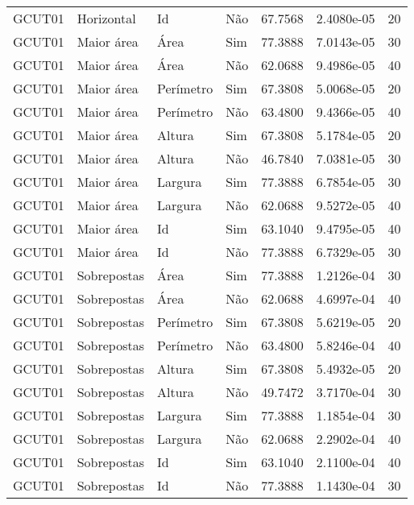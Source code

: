 \begin{tabular}{llllrrr}
GCUT01    & Horizontal  & Id        & Não         & 67.7568      & 2.4080e-05 & 20       \\
GCUT01    & Maior área  & Área      & Sim         & 77.3888      & 7.0143e-05 & 30       \\
GCUT01    & Maior área  & Área      & Não         & 62.0688      & 9.4986e-05 & 40       \\
GCUT01    & Maior área  & Perímetro & Sim         & 67.3808      & 5.0068e-05 & 20       \\
GCUT01    & Maior área  & Perímetro & Não         & 63.4800      & 9.4366e-05 & 40       \\
GCUT01    & Maior área  & Altura    & Sim         & 67.3808      & 5.1784e-05 & 20       \\
GCUT01    & Maior área  & Altura    & Não         & 46.7840      & 7.0381e-05 & 30       \\
GCUT01    & Maior área  & Largura   & Sim         & 77.3888      & 6.7854e-05 & 30       \\
GCUT01    & Maior área  & Largura   & Não         & 62.0688      & 9.5272e-05 & 40       \\
GCUT01    & Maior área  & Id        & Sim         & 63.1040      & 9.4795e-05 & 40       \\
GCUT01    & Maior área  & Id        & Não         & 77.3888      & 6.7329e-05 & 30       \\
GCUT01    & Sobrepostas & Área      & Sim         & 77.3888      & 1.2126e-04 & 30       \\
GCUT01    & Sobrepostas & Área      & Não         & 62.0688      & 4.6997e-04 & 40       \\
GCUT01    & Sobrepostas & Perímetro & Sim         & 67.3808      & 5.6219e-05 & 20       \\
GCUT01    & Sobrepostas & Perímetro & Não         & 63.4800      & 5.8246e-04 & 40       \\
GCUT01    & Sobrepostas & Altura    & Sim         & 67.3808      & 5.4932e-05 & 20       \\
GCUT01    & Sobrepostas & Altura    & Não         & 49.7472      & 3.7170e-04 & 30       \\
GCUT01    & Sobrepostas & Largura   & Sim         & 77.3888      & 1.1854e-04 & 30       \\
GCUT01    & Sobrepostas & Largura   & Não         & 62.0688      & 2.2902e-04 & 40       \\
GCUT01    & Sobrepostas & Id        & Sim         & 63.1040      & 2.1100e-04 & 40       \\
GCUT01    & Sobrepostas & Id        & Não         & 77.3888      & 1.1430e-04 & 30       \\
\hline
\end{tabular}